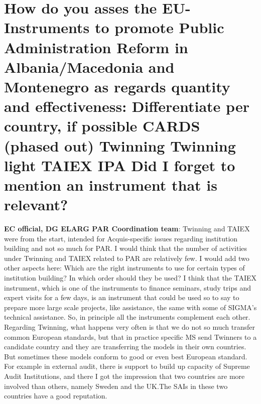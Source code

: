 \section{How do you asses the EU-Instruments to promote Public Administration Reform in
Albania/Macedonia and Montenegro as regards quantity and effectiveness: Differentiate per country, if possible CARDS (phased out) Twinning Twinning light TAIEX IPA Did I forget to mention an instrument that is relevant? }
\label{sec:relevant}
\textbf{EC official, DG ELARG PAR Coordination team}: Twinning and TAIEX were from the start, intended for Acquis-specific issues regarding institution building and not so much for PAR. I would think that the number of activities under Twinning and TAIEX related to PAR are relatively few. I would add two other aspects here: Which are the right instruments to use for certain types of institution building? In which order should they be used? I think that the TAIEX instrument, which is one of the instruments to finance seminars, study trips and expert visits for a few days, is an instrument that could be used so to say to prepare more large scale projects, like assistance, the same with some of SIGMA's technical assistance. So, in principle all the instruments complement each other. Regarding Twinning, what happens very often is that we do not so much transfer common European standards, but that in practice specific MS send Twinners to a candidate country and they are transferring the models in their own countries. But sometimes these models conform to good or even best European standard. For example in external audit, there is support to build up capacity of Supreme Audit Institutions, and there I got the impression that two countries are more involved than others, namely Sweden and the UK.The SAIs in these two countries have a  good reputation.\\
